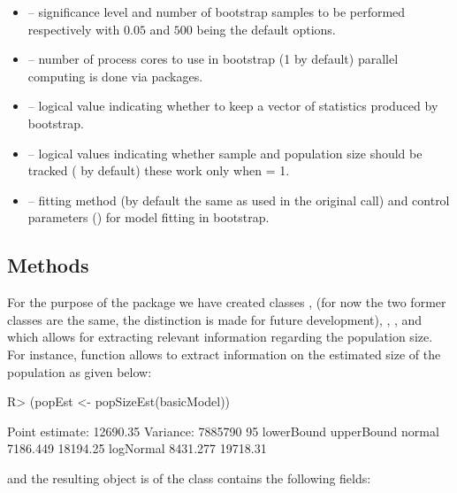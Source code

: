 \documentclass[
]{jss}
\newcommand{\1}{\mathcal{I}} \newcommand{\bZero}{\boldsymbol{0}}
\begin{document}
\begin{itemize}
  \item {} -- significance level and number of bootstrap samples to be performed respectively with $0.05$ and $500$ being the default options.
  \item {} -- number of process cores to use in bootstrap (1 by default) parallel computing is done via  packages.
  \item {} --  logical value indicating whether to keep a vector of statistics produced by bootstrap.
  \item {} --  logical values indicating whether sample and population size should be tracked ( by default) these work only when  = 1.
    \item {} -- fitting method (by default the same as used in the original call) and control parameters () for model fitting in bootstrap.
\end{itemize}

\subsection{Methods}\label{methods}

For the purpose of the package we have created classes
,  (for now the two former
classes are the same, the distinction is made for future development),
, ,
 and 
which allows for extracting relevant information regarding the
population size. For instance, function  allows to
extract information on the estimated size of the population as given
below:

\begin{CodeChunk}
\begin{CodeInput}
R> (popEst <- popSizeEst(basicModel))
\end{CodeInput}
\begin{CodeOutput}
Point estimate: 12690.35
Variance: 7885790
95%
          lowerBound upperBound
normal      7186.449   18194.25
logNormal   8431.277   19718.31
\end{CodeOutput}
\end{CodeChunk}

and the resulting object  is of the
 class contains the following fields:
\end{document}
